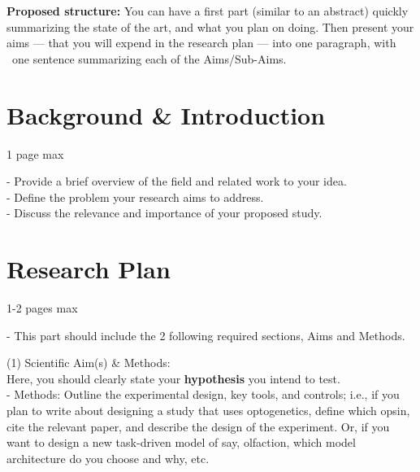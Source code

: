 \documentclass[11pt, notitlepage,a4]{article} %
\begin{document}
\textbf{Proposed structure:} You can have a first part (similar to an abstract) quickly summarizing the state of the art, and what you plan on doing. Then present your aims --- that you will expend in the research plan --- into one paragraph, with ~one sentence summarizing each of the Aims/Sub-Aims.




\section{Background \& Introduction} 
1 page max

- Provide a brief overview of the field and related work to your idea.\\
- Define the problem your research aims to address.\\
- Discuss the relevance and importance of your proposed study.

\section{Research Plan}
1-2 pages max

- This part should include the 2 following required sections, Aims and Methods.

\noindent (1) Scientific Aim(s) \& Methods:\\
Here, you should clearly state your \textbf{hypothesis} you intend to test.\\


- Methods: Outline the experimental design, key tools, and controls; i.e., if you plan to write about designing a study that uses optogenetics, define which opsin, cite the relevant paper, and describe the design of the experiment. Or, if you want to design a new task-driven model of say, olfaction, which model architecture do you choose and why, etc.\\
\end{document}
